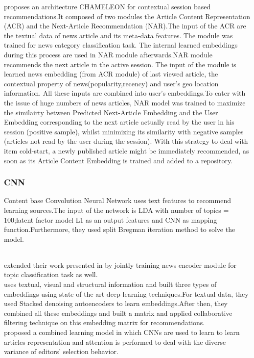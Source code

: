 \cite{N24}proposes an architecture CHAMELEON for contextual session based recommendations.It composed of two modules the Article Content Representation (ACR) and the Next-Article Recommendation (NAR).The input of the ACR are the textual data of news article and its meta-data features. The module was trained for news category classification task. The internal learned embeddings during this process are used in NAR module afterwards.NAR module recommends the next article in the active session. The input of the module is learned news embedding (from ACR module) of last viewed article, the contextual property of news(popularity,recency) and user's geo location information. All these inputs are combined into user's embeddings.To cater with the issue of huge numbers of news articles, NAR model was trained to maximize the similairty between Predicted Next-Article Embedding and the User Embedding corresponding to the next article actually read by the user in his session (positive sample), whilst minimizing its similarity with negative samples (articles not read by the user during the session). With this strategy to deal with item cold-start, a newly published article might be immediately recommended, as soon as its Article Content Embedding is trained and added to a repository.  
\subsubsection{CNN}
\cite{N4} Content base Convolution Neural Network uses text features to recommend learning sources.The input of the network is LDA with number of topics = 100;latent factor model L1 as an output features and CNN as mapping function.Furthermore, they used split Bregman iteration method to solve the model.

\\
\cite{N11}extended their work presented in \cite{N33} by jointly training news encoder module for topic classification task as well.
\\
\cite{N14}uses textual, visual and structural information and built three types of embeddings using state of the art deep learning techniques.For textual data, they used Stacked denoising autoencoders\cite{N14-2} to learn embeddings.After then, they combined all these embeddings and built a matrix and applied collaborative filtering technique on this embedding matrix for recommendations.
\\
\cite{N66}proposed a combined learning model in which CNNs are used to learn to learn articles representation and attention is performed to deal with the diverse variance of editors’ selection behavior.
